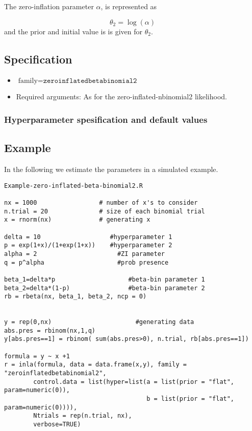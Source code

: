 \documentclass[a4paper,11pt]{article}
\begin{document}
\vspace{5mm}

\noindent
The zero-inflation parameter $\alpha$, is represented as

\begin{displaymath}
    \theta_2 = \log(\alpha)
\end{displaymath}
and the prior and initial value is is given for $\theta_{2}$.

\subsection*{Specification}

\begin{itemize}
\item $\text{family}=\texttt{zeroinflatedbetabinomial2}$
\item Required arguments: As for the zero-inflated-nbinomial2
    likelihood.
\end{itemize}

\subsubsection*{Hyperparameter spesification and default values}


\subsection*{Example}

In the following we estimate the parameters in a simulated example.

\begin{verbatim}
Example-zero-inflated-beta-binomial2.R

nx = 1000                 # number of x's to consider
n.trial = 20              # size of each binomial trial
x = rnorm(nx)             # generating x

delta = 10                   #hyperparameter 1
p = exp(1+x)/(1+exp(1+x))    #hyperparameter 2
alpha = 2                      #ZI parameter
q = p^alpha                    #prob presence

beta_1=delta*p                    #beta-bin parameter 1
beta_2=delta*(1-p)                #beta-bin parameter 2                                 
rb = rbeta(nx, beta_1, beta_2, ncp = 0)

        
y = rep(0,nx)                       #generating data                    
abs.pres = rbinom(nx,1,q)
y[abs.pres==1] = rbinom( sum(abs.pres>0), n.trial, rb[abs.pres==1])

formula = y ~ x +1
r = inla(formula, data = data.frame(x,y), family = "zeroinflatedbetabinomial2",
        control.data = list(hyper=list(a = list(prior = "flat", param=numeric(0)),
                                       b = list(prior = "flat", param=numeric(0)))),
        Ntrials = rep(n.trial, nx),
        verbose=TRUE)
\end{verbatim}
\end{document}
